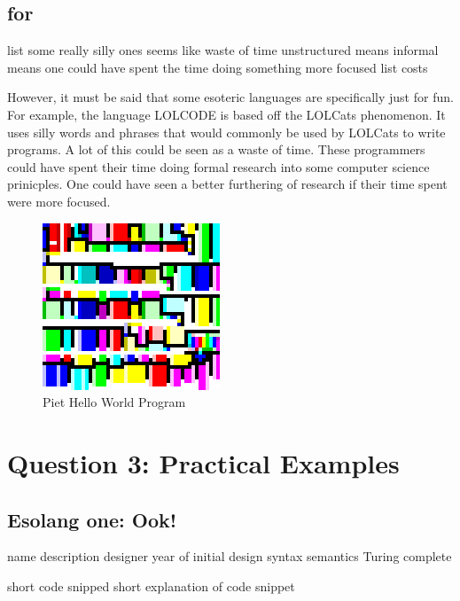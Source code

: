 \documentclass[a4paper]{article}
\begin{document}
	\subsection{for}
	list some really silly ones
	seems like waste of time
	unstructured means informal means one could have spent the time doing something more focused
	list costs
	
	However, it must be said that some esoteric languages are specifically just for fun. For example, the language LOLCODE is based off the LOLCats phenomenon\cite{esolangArt}. It uses silly words and phrases that would commonly be used by LOLCats to write programs. A lot of this could be seen as a waste of time. These programmers could have spent their time doing formal research into some computer science prinicples. One could have seen a better furthering of research if their time spent were more focused. 
	
			\begin{figure}[h]
			\centering
			\includegraphics[width=200px]{helloworld-piet.png}
			\caption{Piet Hello World Program}
		\end{figure}
\section{Question 3: Practical Examples}
	\subsection{Esolang one: Ook!}
	name
	description
		designer
		year of initial design
		syntax
		semantics
		Turing complete
		
	short code snipped
	short explanation of code snippet
	
\end{document}

